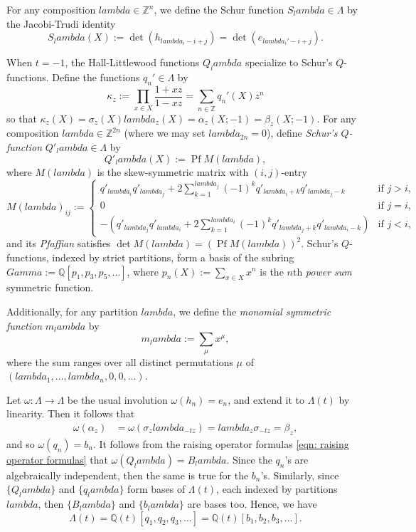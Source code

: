 \documentclass[12pt]{amsart}%
\def\Gamma{Gamma}%
\def\lambda{lambda}%
\theoremstyle{remark}
\theoremstyle{definition}
\newcommand{\Z}{\mathbb{Z}}
\newcommand{\Q}{\mathbb{Q}}
\DeclareMathOperator{\Pf}{Pf}
\begin{document}
    For any composition $\lambda\in\Z^n$, we define the Schur function $S_\lambda\in\Lambda$ by the Jacobi-Trudi identity
    \begin{equation*}
        S_\lambda(X):=\det(h_{\lambda_i-i+j})=\det(e_{\lambda_i'-i+j}).
    \end{equation*}
    
    When $t=-1$, the Hall-Littlewood functions $Q_\lambda$ specialize to Schur's $Q$-functions. Define the functions $q_n'\in\Lambda$ by
    \begin{equation*}
        \kappa_z:=\prod_{x\in X}\frac{1+xz}{1-xz}=\sum_{n\in\Z}q_n'(X)z^n
    \end{equation*}
    so that $\kappa_z(X)=\sigma_z(X)\lambda_z(X)=\alpha_z(X;-1)=\beta_z(X;-1)$. For any composition $\lambda\in\Z^{2n}$ (where we may set $\lambda_{2n}=0$), define \emph{Schur's $Q$-function} $Q'_\lambda\in\Lambda$ by
    \begin{equation*}
        Q'_\lambda(X):=\Pf M(\lambda),
    \end{equation*}
    where $M(\lambda)$ is the skew-symmetric matrix with $(i,j)$-entry
    \begin{equation*}
        M(\lambda)_{ij}:=
        \begin{cases}
            q'_{\lambda_i}q'_{\lambda_j}+2\sum_{k=1}^{\lambda_j}(-1)^kq'_{\lambda_i+k}q'_{\lambda_j-k}&\text{if }j>i,\\
            0&\text{if }j=i,\\
            -\left(q'_{\lambda_j}q'_{\lambda_i}+2\sum_{k=1}^{\lambda_i}(-1)^kq'_{\lambda_j+k}q'_{\lambda_i-k}\right)&\text{if }j<i,
        \end{cases}
    \end{equation*}
    and its \emph{Pfaffian} satisfies $\det M(\lambda)=(\Pf M(\lambda))^2$. Schur's $Q$-functions, indexed by strict partitions, form a basis of the subring $\Gamma:=\Q[p_1,p_3,p_5,\ldots]$, where $p_n(X):=\sum_{x\in X}x^n$ is the $n$th \emph{power sum} symmetric function.

    Additionally, for any partition $\lambda$, we define the \emph{monomial symmetric function} $m_\lambda$ by
    \[m_\lambda:=\sum_\mu x^\mu,\]
    where the sum ranges over all distinct permutations $\mu$ of $(\lambda_1,\ldots,\lambda_n,0,0,\ldots)$.

    Let $\omega:\Lambda\to\Lambda$ be the usual involution $\omega(h_n)=e_n$, and extend it to $\Lambda(t)$ by linearity. Then it follows that
    \begin{align*}
        \omega(\alpha_z)&=\omega\left(\sigma_z\lambda_{-tz}\right)
        =\lambda_z\sigma_{-tz}
        =\beta_z,
    \end{align*}
    and so $\omega(q_n)=b_n$. It follows from the raising operator formulas \eqref{eqn: raising operator formulas} that $\omega(Q_\lambda)=B_\lambda$. Since the $q_n$'s are algebraically independent, then the same is true for the $b_n$'s. Similarly, since $\{Q_\lambda\}$ and $\{q_\lambda\}$ form bases of $\Lambda(t)$, each indexed by partitions $\lambda$, then  $\{B_\lambda\}$ and $\{b_\lambda\}$ are bases too. Hence, we have
    \[\Lambda(t)=\Q(t)[q_1,q_2,q_3,\ldots]=\Q(t)[b_1,b_2,b_3,\ldots].\]
\end{document}

